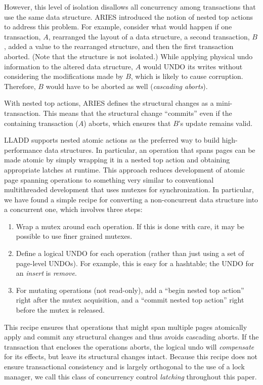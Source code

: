 \documentclass[10pt,letterpaper,twocolumn,english]{article}
\newcommand{\yad}{LLADD\xspace}
\begin{document}
However, this level of isolation disallows all concurrency among 
transactions that use the same data structure.  ARIES introduced the 
notion of nested top actions to
address this problem.  For example, consider what would happen if one
transaction, $A$, rearranged the layout of a data structure, a second
transaction, $B$, added a value to the rearranged structure, and then
the first transaction aborted.  (Note that the structure is not
isolated.)  While applying physical undo information to the altered
data structure,  $A$ would UNDO its writes
without considering the modifications made by
$B$, which is likely to cause corruption.  Therefore, $B$ would 
have to be aborted as well ({\em cascading aborts}).

With nested top actions, ARIES defines the structural changes as a
mini-transaction. This means that the structural change
``commits'' even if the containing transaction ($A$) aborts, which
ensures that $B$'s update remains valid.

\yad supports nested atomic actions as the preferred way to build
high-performance data structures. In particular, an operation that
spans pages can be made atomic by simply wrapping it in a nested top
action and obtaining appropriate latches at runtime.  This approach
reduces development of atomic page spanning operations to something
very similar to conventional multithreaded development that uses mutexes
for synchronization.
In particular, we have found a simple recipe for converting a
non-concurrent data structure into a concurrent one, which involves
three steps:
\begin{enumerate}
\item Wrap a mutex around each operation.  If this is done with care,
  it may be possible to use finer grained mutexes.
\item Define a logical UNDO for each operation (rather than just using
  a set of page-level UNDOs).  For example, this is easy for a
  hashtable; the UNDO for an {\em insert} is {\em remove}.
\item For mutating operations (not read-only), add a ``begin nested
  top action'' right after the mutex acquisition, and a ``commit
  nested top action'' right before the mutex is released.
\end{enumerate}
This recipe ensures that operations that might span multiple pages
atomically apply and commit any structural changes and thus avoids 
cascading aborts.  If the transaction that encloses the operations
aborts, the logical undo will {\em compensate} for
its effects, but leave its structural changes intact. Because this 
recipe does not ensure transactional consistency and is largely 
orthogonal to the use of a lock manager, we call this class of 
concurrency control {\em latching} throughout this paper.
\end{document}
